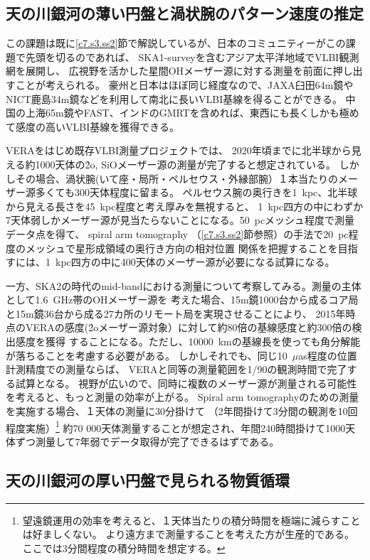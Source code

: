 \setcounter{subsection}{0}\subsection{天の川銀河の薄い円盤と渦状腕のパターン速度の推定}\label{c7.s4.ss1}

この課題は既に\ref{c7.s3.ss2}節で解説しているが、日本のコミュニティーがこの課題で先頭を切るのであれば、
SKA1-surveyを含むアジア太平洋地域でVLBI観測網を展開し、
広視野を活かした星間OHメーザー源に対する測量を前面に押し出すことが考えられる。
豪州と日本はほぼ同じ経度なので、JAXA臼田64m鏡やNICT鹿島34m鏡などを利用して南北に長いVLBI基線を得ることができる。
中国の上海65m鏡やFAST、インドのGMRTを含めれば、東西にも長くしかも極めて感度の高いVLBI基線を獲得できる。

VERAをはじめ既存VLBI測量プロジェクトでは、
2020年頃までに北半球から見える約1000天体の\h2o, SiOメーザー源の測量が完了すると想定されている。
しかしその場合、渦状腕(いて座・局所・ペルセウス・外縁部腕）１本当たりのメーザー源多くても300天体程度に留まる。
ペルセウス腕の奥行きを1~kpc、北半球から見える長さを45~kpc程度と考え厚みを無視すると、
1~kpc四方の中にわずか7天体弱しかメーザー源が見当たらないことになる。50~pcメッシュ程度で測量データ点を得て、
spiral arm tomography （\ref{c7.s3.ss2}節参照）の手法で20~pc程度のメッシュで星形成領域の奥行き方向の相対位置
関係を把握することを目指すには、1~kpc四方の中に400天体のメーザー源が必要になる試算になる。

一方、SKA2の時代のmid-bandにおける測量について考察してみる。測量の主体として1.6~GHz帯のOHメーザー源を
考えた場合、15m鏡1000台から成るコア局と15m鏡36台から成る27カ所のリモート局を実現させることにより、
2015年時点のVERAの感度(\h2oメーザー源対象）に対して約80倍の基線感度と約300倍の検出感度を獲得
することになる。ただし、10000~kmの基線長を使っても角分解能が落ちることを考慮する必要がある。
しかしそれでも、同じ10~$\mu$as程度の位置計測精度での測量ならば、
VERAと同等の測量範囲を1/90の観測時間で完了する試算となる。
視野が広いので、同時に複数のメーザー源が測量される可能性を考えると、もっと測量の効率が上がる。
Spiral arm tomographyのための測量を実施する場合、１天体の測量に30分掛けて
（2年間掛けて3分間の観測を10回程度実施）\footnote
{望遠鏡運用の効率を考えると、１天体当たりの積分時間を極端に減らすことは好ましくない。
より遠方まで測量することを考えた方が生産的である。ここでは3分間程度の積分時間を想定する。}
約70 000天体測量することが想定され、年間240時間掛けて1000天体ずつ測量して7年弱でデータ取得が完了できるはずである。

\setcounter{subsection}{1}\subsection{天の川銀河の厚い円盤で見られる物質循環}\label{c7.s4.ss2}

